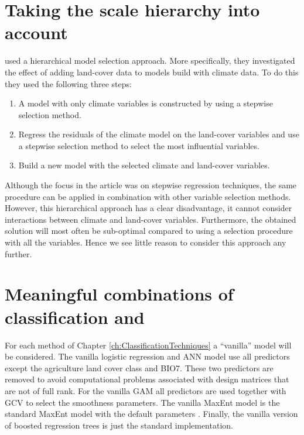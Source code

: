 \section{Taking the scale hierarchy into account}
\label{sec:TakingTheScaleHierarchyIntoAccount}
\cite{thuiller_we_2004} used a hierarchical model selection approach. More specifically, they investigated the effect of adding land-cover data to models build with climate data. To do this they used the following three steps:
\begin{enumerate}
\item A model with only climate variables is constructed by using a stepwise selection method.
\item Regress the residuals of the climate model on the land-cover variables and use a stepwise selection method to select the most influential variables.
\item Build a new model with the selected climate and land-cover variables.
\end{enumerate}
Although the focus in the article was on stepwise regression techniques, the same procedure can be applied in combination with other variable selection methods. However, this hierarchical approach has a clear disadvantage, it cannot consider interactions between climate and land-cover variables. Furthermore, the obtained solution will most often be sub-optimal compared to using a selection procedure with all the variables. Hence we see little reason to consider this approach any further.


\section{Meaningful combinations of classification and }
\label{sec:combinations}
 

For each method of Chapter \ref{ch:ClassificationTechniques} a ``vanilla'' model will be considered. The vanilla logistic regression and ANN model use all predictors except the agriculture land cover class and BIO7. These two predictors are removed to avoid computational problems associated with design matrices that are not of full rank. For the vanilla GAM all predictors are used together with GCV to select the smoothness parameters. The vanilla MaxEnt model is the standard MaxEnt model with the default parameters \parencite{phillips_modeling_2008}. Finally, the vanilla version of boosted regression trees is just the standard implementation. \\


